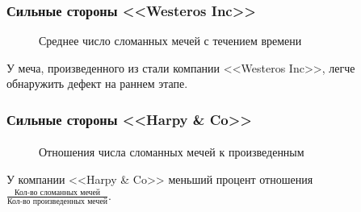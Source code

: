\documentclass[10pt,pdf,hyperref={unicode}]{beamer}
\begin{document}
\begin{frame}
\frametitle{Сильные стороны <<Westeros Inc>>} 
\begin{minipage}{0.4\textwidth}
 	\begin{figure}[L]
		\caption{Среднее число сломанных мечей с течением времени}
	\end{figure}
\end{minipage}
\hfill
\begin{minipage}{0.4\textwidth}
	У меча, произведенного из стали компании <<Westeros Inc>>, легче обнаружить дефект на раннем этапе.
\end{minipage}
\end{frame}

\begin{frame}
\frametitle{Сильные стороны <<Harpy \& Co>>} 
\framesubtitle{}

\begin{minipage}{0.4\textwidth}
 	\begin{figure}[L]
		\caption{Отношения числа сломанных мечей к произведенным}		
	\end{figure}
\end{minipage}
\hfill
\begin{minipage}{0.4\textwidth}
	У компании <<Harpy \& Co>> меньший процент отношения $\frac{\text{Кол-во сломанных мечей}}{\text{Кол-во произведенных мечей}}$.
\end{minipage}
\end{frame}
\end{document}
